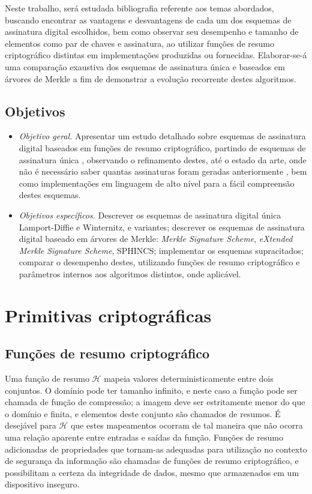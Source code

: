\documentclass{ufsctex/ufsctex}
\newcommand{\hh}{$\mathcal{H}$}
\begin{document}
Neste trabalho, será estudada bibliografia referente aos temas abordados,
buscando encontrar as vantagens e desvantagens de cada um dos esquemas
de assinatura digital escolhidos, bem como observar seu desempenho e tamanho
de elementos como par de chaves e assinatura, ao utilizar funções de resumo
criptográfico distintas em implementações produzidas ou fornecidas.
Elaborar-se-á uma comparação exaustiva dos esquemas de assinatura única e
baseados em árvores de Merkle a fim de demonstrar a evolução recorrente
destes algoritmos.

\section{Objetivos}

\begin{itemize}

  \item \emph{Objetivo geral.} Apresentar um estudo detalhado sobre esquemas
    de assinatura digital baseados em funções de resumo criptográfico,
    partindo de esquemas de assinatura única \cite{Lamport1979}, observando
    o refinamento destes, até o estado da arte, onde não é necessário saber
    quantas assinaturas foram geradas anteriormente \cite{Bernstein2015}, bem
    como implementações em linguagem de alto nível para a fácil compreensão
    destes esquemas.

  \item \emph{Objetivos específicos.} Descrever os esquemas de assinatura
    digital única Lamport-Diffie e Winternitz, e variantes; descrever os
    esquemas de assinatura digital baseado em árvores de Merkle: \emph{Merkle
    Signature Scheme}, \emph{eXtended Merkle Signature Scheme}, SPHINCS;
    implementar os esquemas supracitados; comparar o desempenho destes,
    utilizando funções de resumo criptográfico e parâmetros internos aos
    algoritmos distintos, onde aplicável.

\end{itemize}

\chapter{Primitivas criptográficas}

\section{Funções de resumo criptográfico}

Uma função de resumo \hh{} mapeia valores deterministicamente entre dois
conjuntos. O domínio pode ter tamanho infinito, e neste caso a função pode ser
chamada de função de compressão; a imagem deve ser estritamente menor do que o
domínio e finita, e elementos deste conjunto são chamados de resumos. É
desejável para \hh{} que estes mapeamentos ocorram de tal maneira que não
ocorra uma relação aparente entre entradas e saídas da função. Funções de
resumo adicionadas de propriedades que tornam-as adequadas para utilização no
contexto de segurança da informação são chamadas de funções de resumo
criptográfico, e possibilitam a certeza da integridade de dados, mesmo que
armazenados em um dispositivo inseguro.
\end{document}

